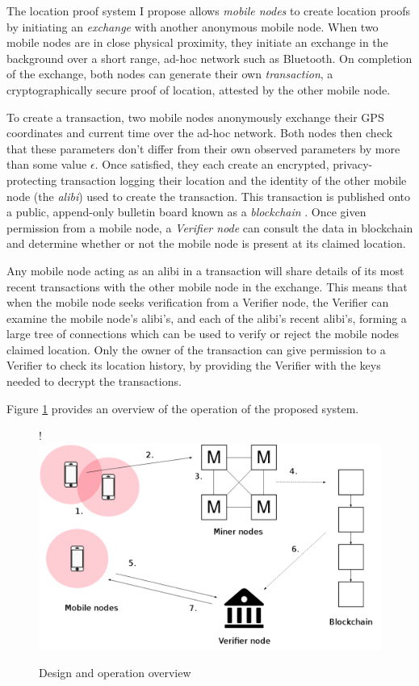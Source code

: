 The location proof system I propose allows \textit{mobile nodes} to create location proofs by initiating an \textit{exchange} with another anonymous mobile node. When two mobile nodes are in close physical proximity, they initiate an exchange in the background over a short range, ad-hoc network such as Bluetooth. On completion of the exchange, both nodes can generate their own \textit{transaction}, a cryptographically secure proof of location, attested by the other mobile node.

To create a transaction, two mobile nodes anonymously exchange their GPS coordinates and current time over the ad-hoc network. Both nodes then check that these parameters don't differ from their own observed parameters by more than some value $\epsilon$. Once satisfied, they each create an encrypted, privacy-protecting transaction logging their location and the identity of the other mobile node (the \textit{alibi}) used to create the transaction. This transaction is published onto a public, append-only bulletin board known as a \textit{blockchain} \cite{blueprint}. Once given permission from a mobile node, a \textit{Verifier node} can consult the data in blockchain and determine whether or not the mobile node is present at its claimed location.

Any mobile node acting as an alibi in a transaction will share details of its most recent transactions with the other mobile node in the exchange. This means that when the mobile node seeks verification from a Verifier node, the Verifier can examine the mobile node's alibi's, and each of the alibi's recent alibi's, forming a large tree of connections which can be used to verify or reject the mobile nodes claimed location. Only the owner of the transaction can give permission to a Verifier to check its location history, by providing the Verifier with the keys needed to decrypt the transactions.

Figure \ref{fig:overview} provides an overview of the operation of the proposed system.

\begin{figure}[H]
\begin{center}
\resizebox {\columnwidth} {!} {\includegraphics{diagrams/overview.png}}
\caption{Design and operation overview}
\label{fig:overview}
\end{center}
\end{figure}

